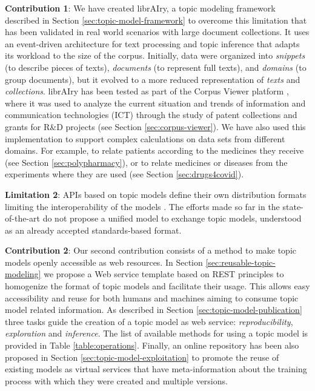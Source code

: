 \textbf{Contribution 1}: We have created librAIry, a topic modeling framework described in Section \ref{sec:topic-model-framework} to overcome this limitation that has been validated in real world scenarios with large document collections. It uses an event-driven architecture for text processing and topic inference that adapts its workload to the size of the corpus. Initially, data were organized into \textit{snippets} (to describe pieces of texts), \textit{documents} (to represent full texts), and \textit{domains} (to group documents), but it  evolved to a more reduced representation of \textit{texts} and \textit{collections}. librAIry has been tested as part of the Corpus Viewer platform \citep{Samy2019}, where it was used to analyze the current situation and trends of information and communication technologies (ICT) through the study of patent collections and grants for R\&D projects (see Section \ref{sec:corpus-viewer}). We have also used this implementation to support complex calculations on data sets from different domains. For example, to relate patients according to the medicines they receive \citep{Badenes-Olmedo2019c} (see Section 	\ref{sec:polypharmacy}), or to relate medicines or diseases from the experiments where they are used (see Section \ref{sec:drugs4covid}). 


\textbf{Limitation 2}: APIs based on topic models define their own distribution formats limiting the interoperability of the models \citep{Lisena:NLPOSS2020}. The efforts made so far in the state-of-the-art do not propose a unified model to exchange topic models, understood as an already accepted standards-based format.

\textbf{Contribution 2}: Our second contribution consists of a method to make topic models openly accessible as web resources. In Section \ref{sec:reusable-topic-modeling} we propose a Web service template based on REST principles to homogenize the format of topic models and facilitate their usage. This allows easy accessibility and reuse for both humans and machines aiming to consume topic model related information. As described in Section \ref{sec:topic-model-publication} three tasks guide the creation of a topic model as web service: \textit{reproducibility}, \textit{exploration} and \textit{inference}. The list of available methods for using a topic model is provided in Table \ref{table:operations}. Finally, an online repository has been also proposed in Section \ref{sec:topic-model-exploitation} to promote the reuse of existing models as virtual services that have meta-information about the training process with which they were created and multiple versions. 

